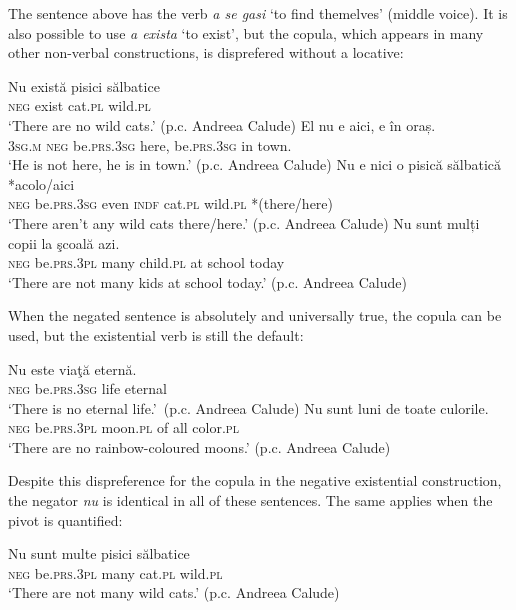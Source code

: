 \documentclass[output=paper]{langsci/langscibook}
\begin{document}
\begin{unindented}
The sentence above has the verb \textit{a se gasi} `to find themelves' (middle voice). It is also possible to use \textit{a exista} `to exist', but the copula, which appears in many other non-verbal constructions, is disprefered without a locative:
%
\begin{exe}\ex \gll Nu există pisici sălbatice \\
\textsc{neg} exist cat.\textsc{pl} wild.\textsc{pl} \\
    \glt `There are no wild cats.' (p.c. Andreea Calude)
\ex \gll El nu e aici, e în oraș.  \\
\textsc{3sg.m} \textsc{neg} be.\textsc{prs}.\textsc{3sg} here,          be.\textsc{prs.3sg} in town.  \\
    \glt `He is not here, he is in town.' (p.c. Andreea Calude)
\ex \gll Nu e nici o pisică sălbatică *{\op}acolo/aici{\cp} \\
\textsc{neg} be.\textsc{prs}.\textsc{3sg} even \textsc{indf} cat.\textsc{pl}  wild.\textsc{pl} *(there/here) \\
    \glt `There aren't any wild cats there/here.' (p.c. Andreea Calude)
\ex \gll Nu sunt mulți copii la şcoală azi.  \\
\textsc{neg} be.\textsc{prs.3pl} many child.\textsc{pl} at school today \\
    \glt `There are not many kids at school today.' (p.c. Andreea Calude)
    \end{exe}

When the negated sentence is absolutely and universally true, the copula can be used, but the existential verb is still the default:
%
\begin{exe}\ex \gll Nu este viaţă eternă.  \\
\textsc{neg} be.\textsc{prs.3sg} life eternal \\
    \glt `There is no eternal life.'~(p.c. Andreea Calude)
\ex \gll Nu sunt luni de toate culorile.  \\
\textsc{neg} be.\textsc{prs.3pl} moon.\textsc{pl} of all color.\textsc{pl} \\
    \glt `There are no rainbow-coloured moons.' (p.c. Andreea Calude)
    \end{exe}

Despite this dispreference for the copula in the negative existential construction, the negator \textit{nu} is identical in all of these sentences. The same applies when the pivot is quantified:
%
\begin{exe}\ex \gll Nu sunt multe pisici sălbatice \\
\textsc{neg} be.\textsc{prs.3pl} many cat.\textsc{pl} wild.\textsc{pl} \\
    \glt `There are not many wild cats.' (p.c. Andreea Calude)
    \end{exe}


\end{unindented}
\end{document}
